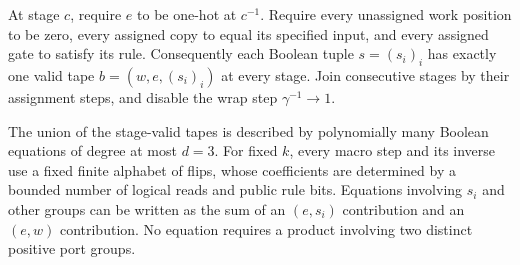 At stage $c$, require $e$ to be one-hot at $c^{-1}$.  Require every
unassigned work position to be zero, every assigned copy to equal its
specified input, and every assigned gate to satisfy its rule.  Consequently
each Boolean tuple $s=(s_i)_i$ has exactly one valid tape
$b=(w,e,(s_i)_i)$ at every stage.  Join consecutive stages by their
assignment steps, and disable the wrap step $\gamma^{-1}\to1$.

\begin{lemma}\label{ia:validity}
The union of the stage-valid tapes is described by polynomially many
Boolean equations of degree at most $d=3$.  For fixed $k$, every macro
step and its inverse use a fixed finite alphabet of flips, whose
coefficients are determined by a bounded number of logical reads and
public rule bits.  Equations involving $s_i$ and other groups can be
written as the sum of an $(e,s_i)$ contribution and an $(e,w)$
contribution.  No equation requires a product involving two distinct
positive port groups.
\end{lemma}

